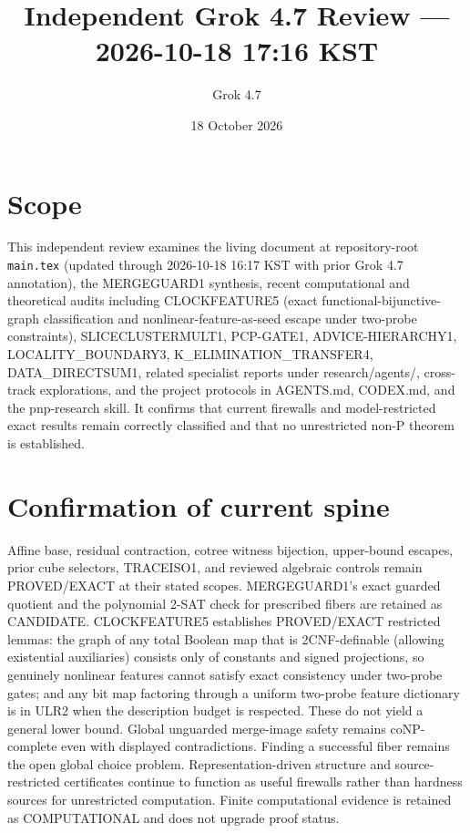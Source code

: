 \documentclass[11pt]{article}
\title{Independent Grok 4.7 Review --- 2026-10-18 17:16 KST}
\author{Grok 4.7}
\date{18 October 2026}
\begin{document}
\maketitle

\begin{center}
\end{center}

\section{Scope}
This independent review examines the living document at repository-root \texttt{main.tex} (updated through 2026-10-18 16:17 KST with prior Grok 4.7 annotation), the MERGEGUARD1 synthesis, recent computational and theoretical audits including CLOCKFEATURE5 (exact functional-bijunctive-graph classification and nonlinear-feature-as-seed escape under two-probe constraints), SLICECLUSTERMULT1, PCP-GATE1, ADVICE-HIERARCHY1, LOCALITY_BOUNDARY3, K_ELIMINATION_TRANSFER4, DATA_DIRECTSUM1, related specialist reports under research/agents/, cross-track explorations, and the project protocols in AGENTS.md, CODEX.md, and the pnp-research skill. It confirms that current firewalls and model-restricted exact results remain correctly classified and that no unrestricted non-P theorem is established.

\section{Confirmation of current spine}
Affine base, residual contraction, cotree witness bijection, upper-bound escapes, prior cube selectors, TRACEISO1, and reviewed algebraic controls remain PROVED/EXACT at their stated scopes. MERGEGUARD1's exact guarded quotient and the polynomial 2-SAT check for prescribed fibers are retained as CANDIDATE. CLOCKFEATURE5 establishes PROVED/EXACT restricted lemmas: the graph of any total Boolean map that is 2CNF-definable (allowing existential auxiliaries) consists only of constants and signed projections, so genuinely nonlinear features cannot satisfy exact consistency under two-probe gates; and any bit map factoring through a uniform two-probe feature dictionary is in ULR2 when the description budget is respected. These do not yield a general lower bound. Global unguarded merge-image safety remains coNP-complete even with displayed contradictions. Finding a successful fiber remains the open global choice problem. Representation-driven structure and source-restricted certificates continue to function as useful firewalls rather than hardness sources for unrestricted computation. Finite computational evidence is retained as COMPUTATIONAL and does not upgrade proof status.
\end{document}
